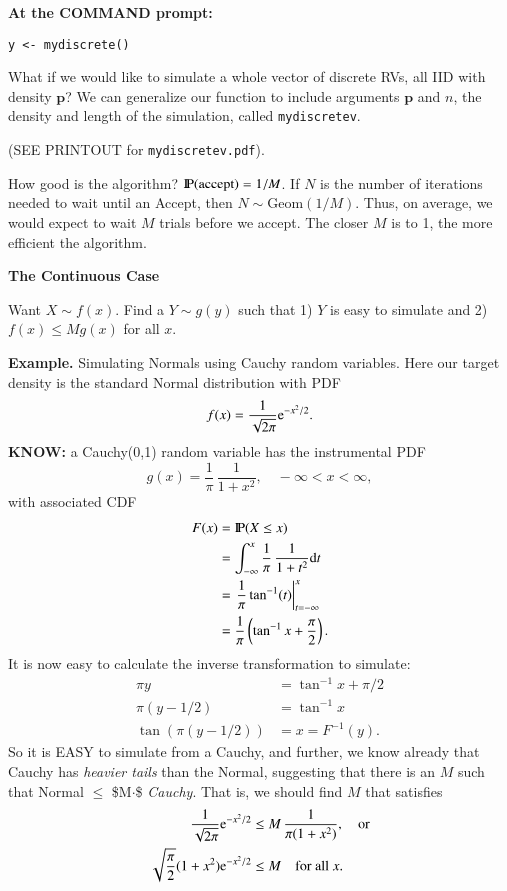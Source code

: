 \documentclass[captions=tableheading]{scrbook}
\begin{document}
\textbf{At the COMMAND prompt:}
\begin{verbatim}
y <- mydiscrete()
\end{verbatim}

What if we would like to simulate a whole vector of discrete RVs, all IID with density $\mathbf{p}$? We can generalize our function to include arguments $\mathbf{p}$ and $n$, the density and length of the simulation, called \texttt{mydiscretev}.

(SEE PRINTOUT for \texttt{mydiscretev.pdf}).

How good is the algorithm? \(\P(\mbox{accept}) = 1/M\). If $N$ is the number of iterations needed to wait until an Accept, then $N\sim\mathrm{Geom}(1/M)$. Thus, on average, we would expect to wait $M$ trials before we accept. The closer $M$ is to 1, the more efficient the algorithm.

\textbf{The Continuous Case}

Want $X\sim f(x)$. Find a $Y\sim g(y)$ such that 1) $Y$ is easy to simulate and 2) $f(x)\leq Mg(x)$ for all $x$.

\textbf{Example.} Simulating Normals using Cauchy random variables.
Here our target density is the standard Normal distribution with PDF
\[
f(x) = \frac{1}{\sqrt{2\pi}} \me^{-x^{2}/2}.
\]
\textbf{KNOW:} a Cauchy(0,1) random variable has the instrumental PDF
\[
g(x)=\frac{1}{\pi}\,\frac{1}{1+x^{2}},\quad -\infty < x < \infty,
\]
with associated CDF
\begin{align*}
F(x) & =\P(X\leq x)\\
 & =\int_{-\infty}^{x}\frac{1}{\pi}\,\frac{1}{1+t^{2}}\diff t\\  & =\left.\frac{1}{\pi}\tan^{-1}(t)\right|_{t=-\infty}^{x}\\
 & =\frac{1}{\pi}\left(\tan^{-1}x+\frac{\pi}{2}\right).
\end{align*}
It is now easy to calculate the inverse transformation to simulate:
\begin{align*}
\pi y & =\tan^{-1}x+\pi/2\\
\pi(y-1/2) & =\tan^{-1}x\\
\tan(\pi(y-1/2)) & =x=F^{-1}(y).
\end{align*}
So it is EASY to simulate from a Cauchy, and further, we know already that Cauchy has \emph{heavier tails} than the Normal, suggesting that there is an $M$ such that Normal $\leq$ \$M$\cdot$\$ \emph{Cauchy}.  That is, we should find $M$ that satisfies 
\begin{align*}
\frac{1}{\sqrt{2\pi}} \me^{-x^{2}/2} & \leq M\,\frac{1}{\pi(1+x^{2})},\quad\mbox{or}\\
\sqrt{\frac{\pi}{2}}(1+x^{2}) \me^{-x^{2}/2} & \leq M\quad\mbox{for all \ensuremath{x}.}
\end{align*}
\end{document}

